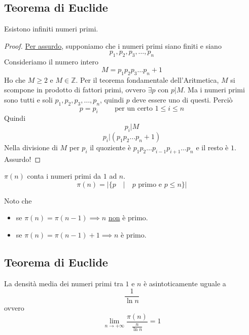 \documentclass[a4paper,12pt, oneside]{book}
\begin{document}
		\subsection{Teorema di Euclide}
			\begin{teorema}
				Esistono infiniti numeri primi.
				
				\begin{proof}
					\underline{Per assurdo}, supponiamo che i numeri primi siano finiti e siano
					$$p_1, p_2, p_3, \dots, p_n$$
					Consideriamo il numero intero
					$$M = p_1p_2p_3 \dots p_n +1$$
					Ho che $M \geq 2$ e $M \in \mathbb{Z}$.
					Per il teorema fondamentale dell'Aritmetica, $M$ si scompone in prodotto di fattori primi, ovvero $\exists p$ con $p|M$.
					Ma i numeri primi sono tutti e soli $p_1, p_2, p_3, \dots, p_n$, quindi $p$ deve essere uno di questi.
					Perciò
					$$p=p_i \qquad \mbox{ per un certo } 1 \leq i \leq n$$
					Quindi 
					$$p_i | M$$
					$$p_i | (p_1p_2 \dots p_n+1)$$
					Nella divisione di $M$ per $p_i$ il quoziente è $p_1p_2 \dots p_{i-1} p_{i+1} \dots p_n$ e il resto è $1$.\\
					Assurdo!
				\end{proof}
			\end{teorema}
			
			\begin{definizione}
				$\pi(n)$ conta i numeri primi da $1$ ad $n$.
				$$\pi(n) = | \{ p \quad | \quad p \mbox{ primo e } p \leq n \} |$$
			\end{definizione}
			
			\begin{nota}
				Noto che \begin{itemize}
					\item se $\pi(n) = \pi(n-1) \implies n$ \underline{non} è primo.
					\item se $\pi(n) = \pi(n-1)+1 \implies n$ è primo.
				\end{itemize}
			\end{nota}
		
		\subsection{Teorema di Euclide}
			\begin{teorema}
				La densità media dei numeri primi tra $1$ e $n$ è asintoticamente uguale a
				$$\frac{1}{\ln n}$$
				ovvero\\
				$$\lim\limits_{n \to +\infty} \frac{\pi(n)}{\frac{n}{\ln n}} = 1$$
			\end{teorema}
			
\end{document}
